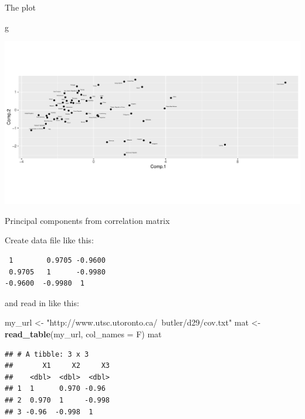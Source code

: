 \documentclass[
  ignorenonframetext,
]{beamer}
\newenvironment{Shaded}{\begin{snugshade}}{\end{snugshade}}
\newcommand{\DataTypeTok}[1]{\textcolor[rgb]{0.13,0.29,0.53}{#1}}
\newcommand{\KeywordTok}[1]{\textcolor[rgb]{0.13,0.29,0.53}{\textbf{#1}}}
\newcommand{\NormalTok}[1]{#1}
\newcommand{\StringTok}[1]{\textcolor[rgb]{0.31,0.60,0.02}{#1}}
\begin{document}
\begin{frame}[fragile]{The plot}
\protect\hypertarget{the-plot-9}{}

\begin{Shaded}
\begin{Highlighting}[]
\NormalTok{g}
\end{Highlighting}
\end{Shaded}

\includegraphics{slides_d29_files/figure-beamer/unnamed-chunk-439-1.pdf}

\end{frame}

\begin{frame}[fragile]{Principal components from correlation matrix}
\protect\hypertarget{principal-components-from-correlation-matrix}{}

Create data file like this:

\begin{verbatim}
 1        0.9705 -0.9600
 0.9705   1      -0.9980
-0.9600  -0.9980  1
\end{verbatim}

and read in like this:

\begin{Shaded}
\begin{Highlighting}[]
\NormalTok{my_url <-}\StringTok{ "http://www.utsc.utoronto.ca/~butler/d29/cov.txt"}
\NormalTok{mat <-}\StringTok{ }\KeywordTok{read_table}\NormalTok{(my_url, }\DataTypeTok{col_names =}\NormalTok{ F)}
\NormalTok{mat}
\end{Highlighting}
\end{Shaded}

\begin{verbatim}
## # A tibble: 3 x 3
##       X1     X2     X3
##    <dbl>  <dbl>  <dbl>
## 1  1      0.970 -0.96 
## 2  0.970  1     -0.998
## 3 -0.96  -0.998  1
\end{verbatim}

\end{frame}
\end{document}
